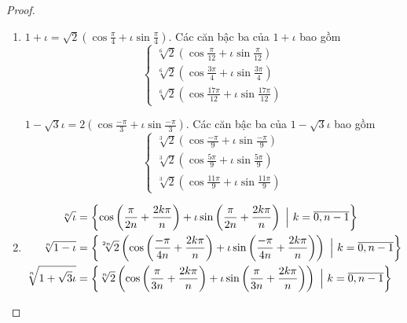 \documentclass[class=linearalgebra,crop=false]{standalone}
\begin{document}
\begin{proof}
    \begin{enumerate}[label = (\alph*)]
        \item $1 + \iota = \sqrt{2}\left(\cos\frac{\pi}{4} + \iota\sin\frac{\pi}{4}\right)$. Các căn bậc ba của $1 + \iota$ bao gồm
            \[
                \begin{cases}
                    \sqrt[6]{2}\left(\cos\frac{\pi}{12} + \iota\sin\frac{\pi}{12}\right) \\
                    \sqrt[6]{2}\left(\cos\frac{3\pi}{4} + \iota\sin\frac{3\pi}{4}\right) \\
                    \sqrt[6]{2}\left(\cos\frac{17\pi}{12} + \iota\sin\frac{17\pi}{12}\right)
                \end{cases}
            \]
            \par $1 - \sqrt{3}\iota = 2\left(\cos\frac{-\pi}{3} + \iota\sin\frac{-\pi}{3}\right)$. Các căn bậc ba của $1 - \sqrt{3}\iota$ bao gồm
            \[
                \begin{cases}
                    \sqrt[3]{2}\left(\cos\frac{-\pi}{9} + \iota\sin\frac{-\pi}{9}\right) \\
                    \sqrt[3]{2}\left(\cos\frac{5\pi}{9} + \iota\sin\frac{5\pi}{9}\right) \\
                    \sqrt[3]{2}\left(\cos\frac{11\pi}{9} + \iota\sin\frac{11\pi}{9}\right)
                \end{cases}
            \]
        \item
            \begin{align*}
                \sqrt[n]{\iota} &= \left\{ \cos\left(\frac{\pi}{2n} + \frac{2k\pi}{n}\right) + \iota\sin\left(\frac{\pi}{2n} + \frac{2k\pi}{n}\right)\ \Big{|} \ k = \overline{0, n-1} \right\} \\
                \sqrt[n]{1-\iota} &= \left\{ \sqrt[2n]{2}\left(\cos\left(\frac{-\pi}{4n} + \frac{2k\pi}{n}\right) + \iota\sin\left(\frac{-\pi}{4n} + \frac{2k\pi}{n}\right)\right)\ \Big{|} \ k = \overline{0, n-1} \right\} \\
                \sqrt[n]{1 + \sqrt{3}\iota} &= \left\{ \sqrt[n]{2}\left(\cos\left(\frac{\pi}{3n} + \frac{2k\pi}{n}\right) + \iota\sin\left(\frac{\pi}{3n} + \frac{2k\pi}{n}\right)\right)\ \Big{|}\ k = \overline{0, n-1} \right\}
            \end{align*}
    \end{enumerate}
\end{proof}
\end{document}
